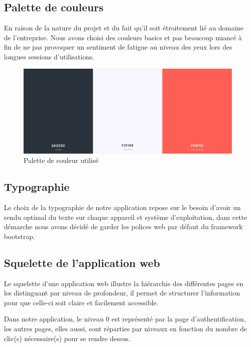 \subsection{Palette de couleurs}
En raison de la nature du projet et du fait qu’il soit étroitement lié au 
domaine de l'entreprise. Nous avons choisi des couleurs basics et pas beaucoup 
nuancé à fin de ne pas provoquer un sentiment de fatigue au niveau des yeux lors 
des longues sessions d'utilisations.

\begin{figure}[h!]
    \centering
    \includegraphics[scale=0.3 ]{images/palette_couleurs.PNG}
    \caption{Palette de couleur utilisé}
    \label{fig89}
\end{figure} 
        
\subsection{Typographie}
Le choix de la typographie de notre application repose sur le besoin d’avoir un 
rendu optimal du texte sur chaque appareil et système d'exploitation, dans cette 
démarche nous avons décidé de garder les polices web par défaut du framework 
bootstrap.
        
\subsection{Squelette de l'application web}
Le squelette d’une application web  illustre la hiérarchie des différentes pages 
en les distinguant par niveau de profondeur, il permet de structurer 
l’information pour que celle-ci soit claire et facilement accessible.

Dans notre application, le niveau 0 est représenté par la page 
d’authentification, les autres pages, elles aussi, sont réparties par niveaux 
en fonction du nombre de clic(s) nécessaire(s) pour se rendre dessus.

